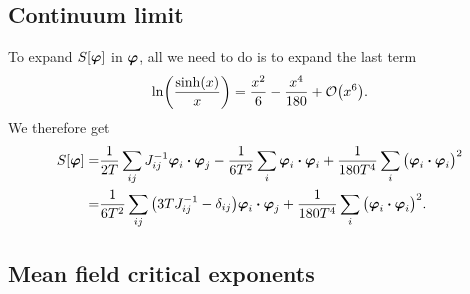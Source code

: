 \documentclass[11pt,letter, swedish, english
]{article}
\begin{document}
\subsection{Continuum limit}
To expand $S[\vb*\varphi]$ in $\vb*\varphi$, all we need to do is to
expand the last term
\begin{equation}
\ln(\frac{\sinh(x)}{x})=\frac{x^2}{6}-\frac{x^4}{180}+\order{x^6}.
\end{equation}
We therefore get
\begin{equation}
\begin{aligned}
S[\vb*\varphi]=&\frac{1}{2T}\sum_{ij}J^{-1}_{ij}\vb*\varphi_i\vdot\vb*\varphi_j
-\frac{1}{6T^2}\sum_i\vb*\varphi_i\vdot\vb*\varphi_i
+\frac{1}{180T^4}\sum_i\big(\vb*\varphi_i\vdot\vb*\varphi_i\big)^2\\
=&\frac{1}{6T^2}\sum_{ij}\qty(3TJ^{-1}_{ij}-\delta_{ij})\vb*\varphi_i\vdot\vb*\varphi_j
+\frac{1}{180T^4}\sum_i\big(\vb*\varphi_i\vdot\vb*\varphi_i\big)^2.
\end{aligned}
\end{equation}


\subsection{Mean field critical exponents}
\end{document}

